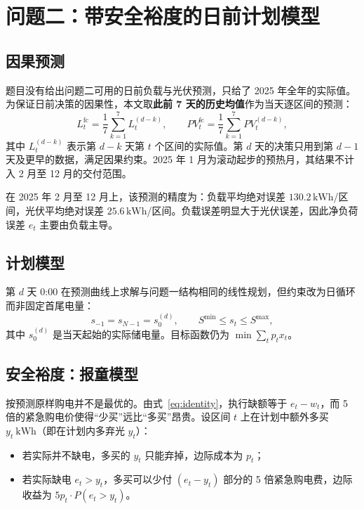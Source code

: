 \section{问题二：带安全裕度的日前计划模型}

\subsection{因果预测}

题目没有给出问题二可用的日前负载与光伏预测，只给了 2025 年全年的实际值。为保证日前决策的因果性，本文取\textbf{此前 7 天的历史均值}作为当天逐区间的预测：
\begin{equation}
L_t^{\mathrm{fc}}=\frac1{7}\sum_{k=1}^{7}L_t^{(d-k)},\qquad
PV_t^{\mathrm{fc}}=\frac1{7}\sum_{k=1}^{7}PV_t^{(d-k)},
\label{eq:fc}
\end{equation}
其中 $L_t^{(d-k)}$ 表示第 $d-k$ 天第 $t$ 个区间的实际值。第 $d$ 天的决策只用到第 $d-1$ 天及更早的数据，满足因果约束。2025 年 1 月为滚动起步的预热月，其结果不计入 2 月至 12 月的交付范围。

在 2025 年 2 月至 12 月上，该预测的精度为：负载平均绝对误差 $130.2\,\mathrm{kWh}$/区间，光伏平均绝对误差 $25.6\,\mathrm{kWh}$/区间。负载误差明显大于光伏误差，因此净负荷误差 $e_t$ 主要由负载主导。

\subsection{计划模型}

第 $d$ 天 0:00 在预测曲线上求解与问题一结构相同的线性规划，但约束改为日循环而非固定首尾电量：
\begin{equation}
s_{-1}=s_{N-1}=s^{(d)}_0,\qquad
S^{\min}\le s_t\le S^{\max},
\label{eq:p2soc}
\end{equation}
其中 $s^{(d)}_0$ 是当天起始的实际储电量。目标函数仍为 $\min\sum_t p_t x_t$。

\subsection{安全裕度：报童模型}

按预测原样购电并不是最优的。由式~\eqref{eq:identity}，执行缺额等于 $e_t-w_t$，而 5 倍的紧急购电价使得“少买”远比“多买”昂贵。设区间 $t$ 上在计划中额外多买 $y_t\ \mathrm{kWh}$（即在计划内多弃光 $y_t$）：

\begin{itemize}
  \item 若实际并不缺电，多买的 $y_t$ 只能弃掉，边际成本为 $p_t$；
  \item 若实际缺电 $e_t>y_t$，多买可以少付 $(e_t-y_t)$ 部分的 5 倍紧急购电费，边际收益为 $5p_t\cdot P(e_t>y_t)$。
\end{itemize}

